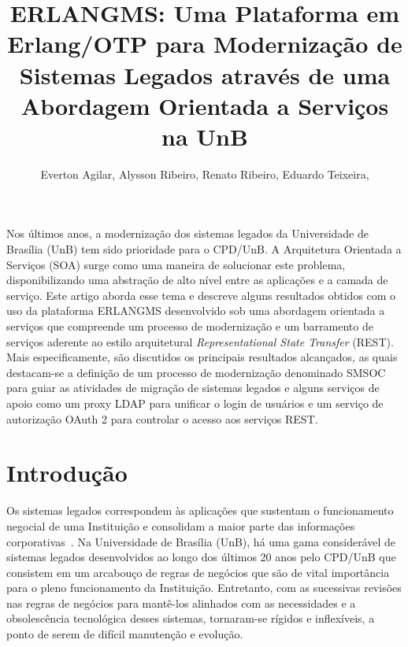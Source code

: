 \documentclass[12pt]{article}
\title{ERLANGMS: Uma Plataforma em Erlang/OTP para 
Modernização de Sistemas Legados através de uma Abordagem Orientada a Serviços na UnB}
\author{
	Everton Agilar\inst{1},
	Alysson Ribeiro\inst{1},
	Renato Ribeiro\inst{1},
	Eduardo Teixeira\inst{1},
}
\begin{document}
 

\maketitle


     
\begin{resumo} 
Nos últimos anos, a modernização dos sistemas legados da Universidade de Brasília (UnB) tem sido 
prioridade para o CPD/UnB. 
A Arquitetura Orientada a Serviços (SOA) surge como uma maneira de solucionar 
este problema, disponibilizando uma abstração de alto nível entre as aplicações e a camada de serviço.
Este artigo aborda esse tema e descreve alguns resultados obtidos com o uso 
da plataforma ERLANGMS desenvolvido sob 
uma abordagem orientada a serviços que compreende um processo 
de moderniza\c c\~{a}o e um barramento de serviços aderente ao estilo 
arquitetural \textit{Representational State Transfer} (REST). 
Mais especificamente, são discutidos os principais resultados alcançados, 
as quais destacam-se a definição de um processo de modernização denominado SMSOC 
para guiar as atividades de 
migração de sistemas legados 
e alguns serviços de apoio 
como um proxy LDAP para unificar o login de usuários e 
um serviço de autorização OAuth 2
para controlar o acesso aos serviços REST.
\end{resumo}


\section{Introdução}

Os sistemas legados correspondem às aplicações que sustentam o funcionamento 
negocial de uma Instituição e consolidam a maior parte das informações corporativas~\cite{S4_bennett1995legacy}. 
Na Universidade de Brasília (UnB), há uma gama considerável de sistemas legados desenvolvidos 
ao longo dos últimos 20 anos pelo CPD/UnB que consistem em um arcabouço 
de regras de negócios que são de vital importância para o 
pleno funcionamento da Instituição. Entretanto, com as 
sucessivas revisões nas regras de negócios para mantê-los alinhados
com as necessidades e a obsolescência tecnológica desses sistemas, 
tornaram-se rígidos e inflexíveis, a ponto de serem de difícil manutenção e evolução. 
\end{document}
